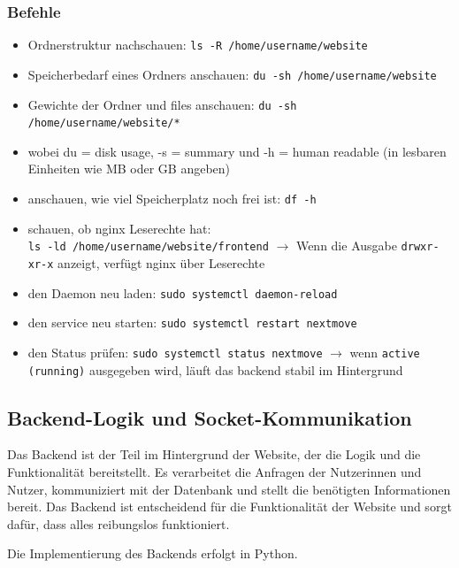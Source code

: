 \subsubsection{Befehle}
\begin{itemize}
    \item Ordnerstruktur nachschauen: \texttt{ls -R /home/username/website}
    \item Speicherbedarf eines Ordners anschauen: \texttt{du -sh /home/username/website}
    \item Gewichte der Ordner und files anschauen: \texttt{du -sh /home/username/website/*}
    \item wobei du = disk usage, -s = summary und -h = human readable (in lesbaren Einheiten wie MB oder GB angeben)
    \item anschauen, wie viel Speicherplatz noch frei ist: \texttt{df -h}
    \item schauen, ob nginx Leserechte hat: \\ \texttt{ls -ld /home/username/website/frontend} $\rightarrow$ Wenn die Ausgabe \texttt{drwxr-xr-x} anzeigt, verfügt nginx über Leserechte
    \item den Daemon neu laden: \texttt{sudo systemctl daemon-reload}
    \item den service neu starten: \texttt{sudo systemctl restart nextmove}
    \item den Status prüfen: \texttt{sudo systemctl status nextmove} $\rightarrow$ wenn \texttt{active (running)} ausgegeben wird, läuft das backend stabil im Hintergrund
\end{itemize}



\subsection{Backend-Logik und Socket-Kommunikation}
Das Backend ist der Teil im Hintergrund der Website, der die Logik und die Funktionalität 
bereitstellt. Es verarbeitet die Anfragen der Nutzerinnen und Nutzer, kommuniziert mit der 
Datenbank und stellt die benötigten Informationen bereit. Das Backend ist entscheidend für 
die Funktionalität der Website und sorgt dafür, dass alles reibungslos funktioniert.

Die Implementierung des Backends erfolgt in Python. 

